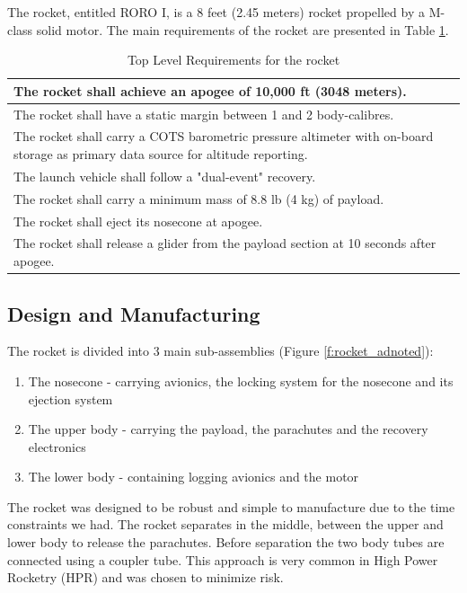 
The rocket, entitled RORO I, is a 8 feet (2.45 meters) rocket propelled by a M-class solid motor. The main requirements of the rocket are presented in Table \ref{table:se_topLevelR}.

\begin{table}[h!]
\centering
\begin{tabular}{|p{}|}
\hline
    The rocket shall achieve an apogee of 10,000 ft (3048 meters).  \\ \hline
    The rocket shall have a static margin between 1 and 2 body-calibres. \\ \hline
    The rocket shall carry a COTS barometric pressure altimeter with on-board storage as primary data source for altitude reporting.  \\ \hline
    The launch vehicle shall follow a "dual-event" recovery. \\ \hline
    The rocket shall carry a minimum mass of 8.8 lb (4 kg) of payload. \\ \hline
    The rocket shall eject its nosecone at apogee. \\ \hline
    The rocket shall release a glider from the payload section at 10 seconds after apogee. \\ \hline

\end{tabular}
\caption{Top Level Requirements for the rocket}
\label{table:se_topLevelR}
\end{table}


\subsection{Design and Manufacturing}


The rocket is divided into 3 main sub-assemblies (Figure \ref{f:rocket_adnoted}):

\begin{enumerate}[noitemsep]
    \item The nosecone - carrying avionics, the locking system for the nosecone and its ejection system
    \item The upper body - carrying the payload, the parachutes and the recovery electronics
    \item The lower body - containing logging avionics and the motor
\end{enumerate}
The rocket was designed to be robust and simple to manufacture due to the time constraints we had.
The rocket separates in the middle, between the upper and lower body to release the parachutes. Before separation the two body tubes are connected using a coupler tube.
This approach is very common in High Power Rocketry (HPR) and was chosen to minimize risk.

